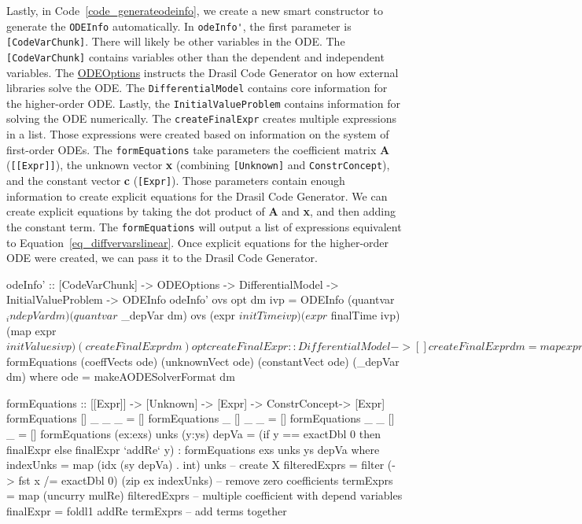 Lastly, in Code~\ref{code_generateodeinfo}, we create a new smart constructor to generate the \verb|ODEInfo| automatically. In \verb|odeInfo'|, the first parameter is \verb|[CodeVarChunk]|. There will likely be other variables in the ODE. The \verb|[CodeVarChunk]| contains variables other than the dependent and independent variables. The \href{https://jacquescarette.github.io/Drasil/docs/full/drasil-code-0.1.9.0/Language-Drasil-Data-ODEInfo.html#t:ODEOptions}{ODEOptions} instructs the Drasil Code Generator on how external libraries solve the ODE. The \verb|DifferentialModel| contains core information for the higher-order ODE. Lastly, the \verb|InitialValueProblem| contains information for solving the ODE numerically. The \verb|createFinalExpr| creates multiple expressions in a list. Those expressions were created based on information on the system of first-order ODEs. The \verb|formEquations| take parameters the coefficient matrix \textbf{A} (\verb|[[Expr]]|), the unknown vector \textbf{x} (combining \verb|[Unknown]| and \verb|ConstrConcept|), and the constant vector \textbf{c} (\verb|[Expr]|). Those parameters contain enough information to create explicit equations for the Drasil Code Generator. We can create explicit equations by taking the dot product of \textbf{A} and \textbf{x}, and then adding the constant term. The \verb|formEquations| will output a list of expressions equivalent to Equation~\ref{eq_diffvervarslinear}. Once explicit equations for the higher-order ODE were created, we can pass it to the Drasil Code Generator.

\begin{listing}[ht]
\begin{haskell1}
odeInfo' :: [CodeVarChunk] -> ODEOptions -> DifferentialModel -> InitialValueProblem -> ODEInfo
odeInfo' ovs opt dm ivp = ODEInfo 
  (quantvar $ _indepVar dm) 
  (quantvar $ _depVar dm) 
  ovs 
  (expr $ initTime ivp)
  (expr $ finalTime ivp)
  (map expr $ initValues ivp)
  (createFinalExpr dm)
  opt

createFinalExpr :: DifferentialModel -> []
createFinalExpr dm = map expr $ formEquations (coeffVects ode) (unknownVect ode) (constantVect ode) (_depVar dm)
  where ode = makeAODESolverFormat dm

formEquations :: [[Expr]] -> [Unknown] -> [Expr] -> ConstrConcept-> [Expr]
formEquations [] _ _ _ = []
formEquations _ [] _ _ = []
formEquations _ _ [] _ = []
formEquations (ex:exs) unks (y:ys) depVa =
  (if y == exactDbl 0 then finalExpr else finalExpr `addRe` y) : formEquations exs unks ys depVa
  where indexUnks = map (idx (sy depVa) . int) unks -- create X
        filteredExprs = filter (\x -> fst x /= exactDbl 0) (zip ex indexUnks) -- remove zero coefficients
        termExprs = map (uncurry mulRe) filteredExprs -- multiple coefficient with depend variables
        finalExpr = foldl1 addRe termExprs -- add terms together
\end{haskell1}
\label{code_generateodeinfo}
\end{listing}
